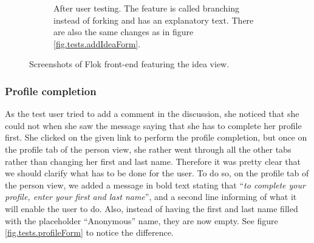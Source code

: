 \documentclass[a4paper,12pt,twoside]{article}
\begin{document}
\begin{figure}[!htb]
\begin{subfigure}[t]{.495\textwidth}
        \caption{After user testing. The feature is called branching instead of forking and has an explanatory text. There are also the same changes as in figure \ref{fig.tests.addIdeaForm}.}
        \label{fig.tests.forkBranchForm.after}
    \end{subfigure}
    \caption{Screenshots of Flok front-end featuring the idea view.}
    \label{fig.tests.forkBranchForm}
\end{figure}

\subsubsection*{Profile completion}
As the test user tried to add a comment in the discussion, she noticed that she could not when she saw the message saying that she has to complete her profile first.
She clicked on the given link to perform the profile completion, but once on the profile tab of the person view, she rather went through all the other tabs rather than changing her first and last name.
Therefore it was pretty clear that we should clarify what has to be done for the user.
To do so, on the profile tab of the person view, we added a message in bold text stating that “\emph{to complete your profile, enter your first and last name}”, and a second line informing of what it will enable the user to do.
Also, instead of having the first and last name filled with the placeholder “Anonymous” name, they are now empty.
See figure \ref{fig.tests.profileForm} to notice the difference.
\end{document}
